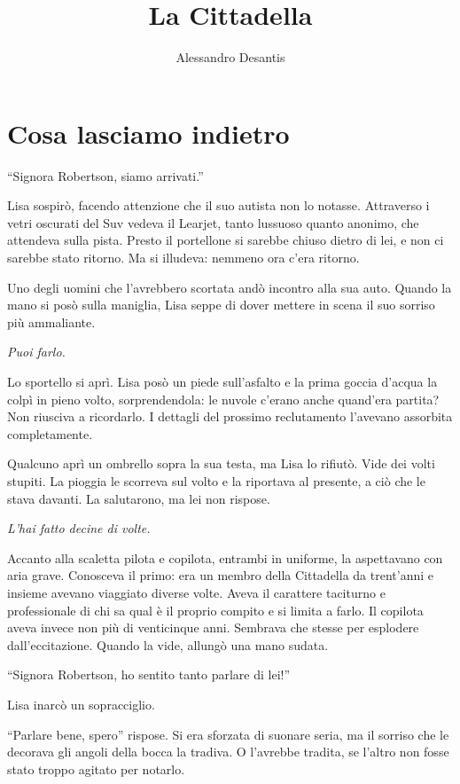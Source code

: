 \documentclass[a4paper,oneside,11pt]{memoir}
\title{La Cittadella}
\author{Alessandro Desantis}
\date{}
\begin{document}
\begin{titlingpage}
\maketitle
\end{titlingpage}

\chapter{Cosa lasciamo indietro}

``Signora Robertson, siamo arrivati.''

Lisa sospirò, facendo attenzione che il suo autista non lo notasse. Attraverso i
vetri oscurati del Suv vedeva il Learjet, tanto lussuoso quanto anonimo, che
attendeva sulla pista. Presto il portellone si sarebbe chiuso dietro di lei, e
non ci sarebbe stato ritorno. Ma si illudeva: nemmeno ora c'era ritorno.

Uno degli uomini che l'avrebbero scortata andò incontro alla sua auto. Quando la
mano si posò sulla maniglia, Lisa seppe di dover mettere in scena il suo sorriso
più ammaliante.

\emph{Puoi farlo.}

Lo sportello si aprì. Lisa posò un piede sull'asfalto e la prima goccia d'acqua
la colpì in pieno volto, sorprendendola: le nuvole c'erano anche quand'era
partita? Non riusciva a ricordarlo. I dettagli del prossimo reclutamento
l'avevano assorbita completamente.

Qualcuno aprì un ombrello sopra la sua testa, ma Lisa lo rifiutò. Vide dei volti
stupiti. La pioggia le scorreva sul volto e la riportava al presente, a ciò che
le stava davanti. La salutarono, ma lei non rispose.

\emph{L'hai fatto decine di volte.}

Accanto alla scaletta pilota e copilota, entrambi in uniforme, la aspettavano
con aria grave. Conosceva il primo: era un membro della Cittadella da
trent'anni e insieme avevano viaggiato diverse volte. Aveva il carattere
taciturno e professionale di chi sa qual è il proprio compito e si limita a
farlo. Il copilota aveva invece non più di venticinque anni. Sembrava che stesse
per esplodere dall'eccitazione. Quando la vide, allungò una mano sudata.

``Signora Robertson, ho sentito tanto parlare di lei!''

Lisa inarcò un sopracciglio.

``Parlare bene, spero'' rispose. Si era sforzata di suonare seria, ma il sorriso
che le decorava gli angoli della bocca la tradiva. O l'avrebbe tradita, se
l'altro non fosse stato troppo agitato per notarlo.
\end{document}
